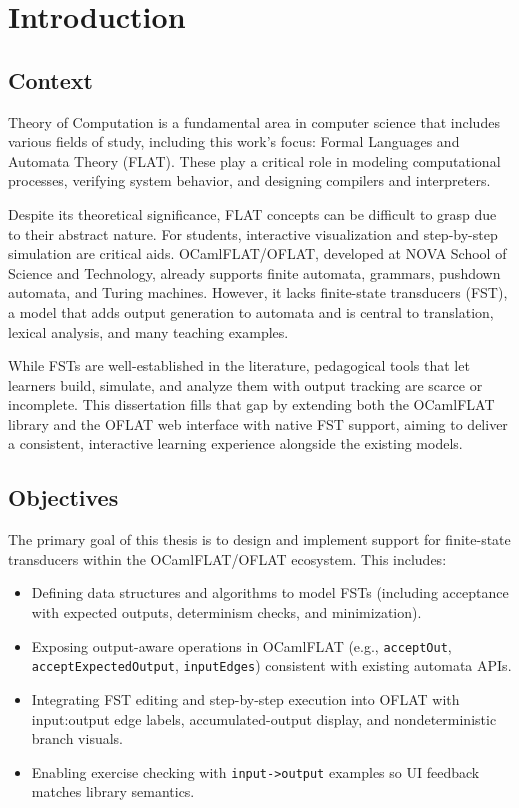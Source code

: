%

\chapter{Introduction}
\label{cha:introduction}

\section{Context}

Theory of Computation is a fundamental area in computer science that includes various
fields of study, including this work's focus: Formal Languages and Automata
Theory (FLAT). These play a critical role in modeling computational processes, verifying system behavior, 
and designing compilers and interpreters. 

Despite its theoretical significance, FLAT concepts can be difficult to grasp due to their abstract nature. For students, interactive
visualization and step-by-step simulation are critical aids. OCamlFLAT/OFLAT, developed at NOVA School of Science and Technology, already
supports finite automata, grammars, pushdown automata, and Turing machines. However, it lacks finite-state transducers (FST), a
model that adds output generation to automata and is central to translation, lexical analysis, and many teaching examples.

While FSTs are well-established in the literature, pedagogical tools that let learners build, simulate, and analyze them with
output tracking are scarce or incomplete. This dissertation fills that gap by extending both the OCamlFLAT library and the OFLAT
web interface with native FST support, aiming to deliver a consistent, interactive learning experience alongside the existing
models.

\section{Objectives}

The primary goal of this thesis is to design and implement support for finite-state transducers within the OCamlFLAT/OFLAT ecosystem. This includes:
\begin{itemize}
  \item Defining data structures and algorithms to model FSTs (including acceptance with expected outputs, determinism checks, and minimization).
  \item Exposing output-aware operations in OCamlFLAT (e.g., \texttt{acceptOut}, \texttt{acceptExpectedOutput}, \texttt{inputEdges}) 
  consistent with existing automata APIs.
  \item Integrating FST editing and step-by-step execution into OFLAT with input:output edge labels, accumulated-output display, 
  and nondeterministic branch visuals.
  \item Enabling exercise checking with \texttt{input->output} examples so UI feedback matches library semantics.
\end{itemize}

